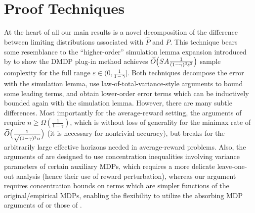 \documentclass{article}
\theoremstyle{plain}
\theoremstyle{plain}
\theoremstyle{remark}
\theoremstyle{plain}
\theoremstyle{plain}
\newcommand{\Phat}{\widehat{P}}
\newcommand{\Otilde}{\widetilde{O}}
\newcommand\cig[1]{\scalerel*[5.5pt]{\Big#1}{%
  \ensurestackMath{\addstackgap[1.5pt]{\big#1}}}}
\newcommand\cigl[1]{\mathopen{\cig{#1}}}
\newcommand\cigr[1]{\mathclose{\cig{#1}}}
\newcommand{\plugin}{plug-in\xspace}
\begin{document}
\section{Proof Techniques}
\label{sec:proof_techniques}
At the heart of all our main results is a novel decomposition of the difference between limiting distributions associated with $\Phat$ and $P$. This technique bears some resemblance to the ``higher-order'' simulation lemma expansion introduced by \cite{li_breaking_2020} to show the DMDP \plugin method achieves $\Otilde \cigl(SA \frac{1}{(1-\gamma)^3 \varepsilon^2} \cigr)$ sample complexity for the full range $\varepsilon \in (0, \frac{1}{1-\gamma}]$. Both techniques decompose the error with the simulation lemma, use law-of-total-variance-style arguments to bound some leading terms, and obtain lower-order error terms which can be inductively bounded again with the simulation lemma.
However, there are many subtle differences. Most importantly for the average-reward setting, the arguments of \cite{li_breaking_2020} require $n \geq \Omega(\frac{1}{1-\gamma})$, which is without loss of generality for the minimax rate of $\Otilde \cigl( \frac{1}{\sqrt{(1-\gamma)^3n}} \cigr)$ (it is necessary for nontrivial accuracy), but breaks for the arbitrarily large effective horizons needed in average-reward problems.
Also, the arguments of \cite{li_breaking_2020} are designed to use concentration inequalities involving variance parameters of certain auxiliary MDPs, which requires a more delicate leave-one-out analysis (hence their use of reward perturbation), whereas our argument requires concentration bounds on terms which are simpler functions of the original/empirical MDPs, enabling the flexibility to utilize the absorbing MDP arguments of \cite{agarwal_model-based_2020} or those of \cite{li_breaking_2020}.
\end{document}
